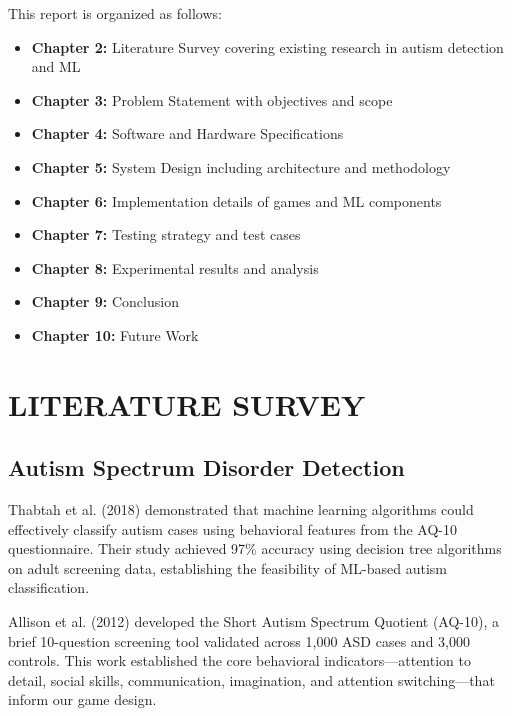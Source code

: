 \documentclass[12pt,letterpaper]{article}
\begin{document}
This report is organized as follows:
\begin{itemize}
    \item \textbf{Chapter 2:} Literature Survey covering existing research in autism detection and ML
    \item \textbf{Chapter 3:} Problem Statement with objectives and scope
    \item \textbf{Chapter 4:} Software and Hardware Specifications
    \item \textbf{Chapter 5:} System Design including architecture and methodology
    \item \textbf{Chapter 6:} Implementation details of games and ML components
    \item \textbf{Chapter 7:} Testing strategy and test cases
    \item \textbf{Chapter 8:} Experimental results and analysis
    \item \textbf{Chapter 9:} Conclusion
    \item \textbf{Chapter 10:} Future Work
\end{itemize}

\newpage


\section{LITERATURE SURVEY}

\subsection{Autism Spectrum Disorder Detection}

Thabtah et al. (2018) demonstrated that machine learning algorithms could effectively classify autism cases using behavioral features from the AQ-10 questionnaire. Their study achieved 97\% accuracy using decision tree algorithms on adult screening data, establishing the feasibility of ML-based autism classification.

Allison et al. (2012) developed the Short Autism Spectrum Quotient (AQ-10), a brief 10-question screening tool validated across 1,000 ASD cases and 3,000 controls. This work established the core behavioral indicators—attention to detail, social skills, communication, imagination, and attention switching—that inform our game design.
\end{document}
